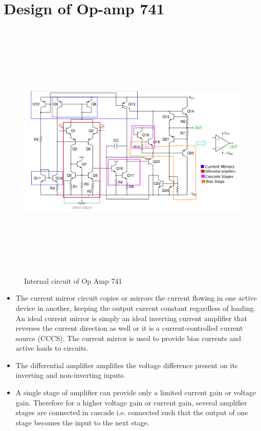 \documentclass[12pt]{article}
\begin{document}
\section{Design of Op-amp 741}

        \begin{figure}[H]
            \centering
            \includegraphics[width = \linewidth, height=5in]{opamp.jpeg}
            \caption{Internal circuit of Op Amp 741}
        \end{figure}
        
\begin{itemize}
    \item The current mirror circuit copies or mirrors the current flowing in one active device in another, keeping the output current constant regardless of loading. An ideal current mirror is simply an ideal inverting current amplifier that reverses the current direction as well or it is a current-controlled current source (CCCS). The current mirror is used to provide bias currents and active loads to circuits.
    \item The differential amplifier amplifies the voltage difference present on its inverting and non-inverting inputs.
    \item A single stage of amplifier can provide only a limited current gain or voltage gain. Therefore for a higher voltage gain or current gain, several amplifier stages are connected in cascade i.e. connected such that the output of one stage becomes the input to the next stage.
\end{itemize}
\newpage
\end{document}
